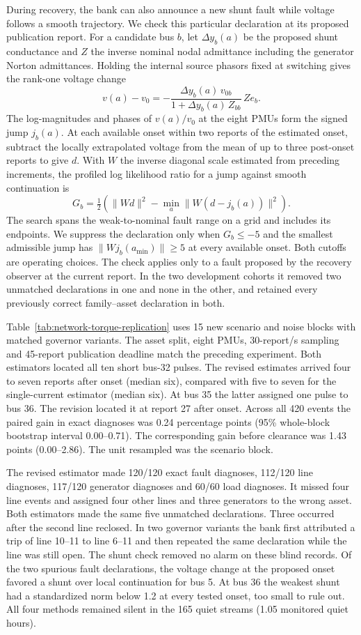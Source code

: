During recovery, the bank can also announce a new shunt fault while
voltage follows a smooth trajectory. We check this particular
declaration at its proposed publication report. For a candidate
bus $b$, let $\Delta y_b(a)$ be the proposed shunt conductance and
$Z$ the inverse nominal nodal admittance including the generator
Norton admittances. Holding the internal source phasors fixed at
switching gives the rank-one voltage change
\[
 v(a)-v_0=-\frac{\Delta y_b(a)\,v_{0b}}
                    {1+\Delta y_b(a)\,Z_{bb}}\, Z e_b .
\]
The log-magnitudes and phases of $v(a)/v_0$ at the eight PMUs
form the signed jump $j_b(a)$.
At each available onset within two reports of the estimated onset,
subtract the locally extrapolated voltage from the mean of up to
three post-onset reports to give $d$. With $W$ the inverse diagonal
scale estimated from preceding increments, the profiled log likelihood
ratio for a jump against smooth continuation is
\[
 G_b=\tfrac12\left(\|Wd\|^2-\min_a\|W(d-j_b(a))\|^2\right).
\]
The search spans the weak-to-nominal fault range on a grid and
includes its endpoints. We suppress the declaration only when
$G_b\leq -5$ and the smallest admissible jump has
$\|Wj_b(a_{\min})\|\geq5$ at every available onset. Both cutoffs
are operating choices. The check applies only to a fault proposed
by the recovery observer at the current report. In the two
development cohorts it removed two unmatched declarations in one
and none in the other, and retained every previously correct
family--asset declaration in both.



Table~\ref{tab:network-torque-replication} uses 15 new scenario and
noise blocks with matched governor variants. The asset split, eight
PMUs, 30-report/s sampling and 45-report publication deadline match
the preceding experiment. Both estimators located all ten short
bus-32 pulses. The revised estimates arrived four to seven reports
after onset (median six), compared with five to seven for the
single-current estimator (median six). At bus 35 the latter assigned
one pulse to bus 36. The revision located it at report 27 after onset.
Across all 420 events the paired gain in exact diagnoses was 0.24
percentage points (95\% whole-block bootstrap interval 0.00--0.71).
The corresponding gain before clearance was 1.43 points
(0.00--2.86). The unit resampled was the scenario block.

The revised estimator made 120/120 exact fault diagnoses, 112/120
line diagnoses, 117/120 generator diagnoses and 60/60 load diagnoses.
It missed four line events and assigned four other lines and three
generators to the wrong asset. Both estimators made the same five
unmatched declarations. Three occurred after the second line
reclosed. In two governor variants the bank first attributed a
trip of line 10--11 to line 6--11 and then repeated the same
declaration while the line was still open. The shunt check removed
no alarm on these blind records. Of the two spurious fault
declarations, the voltage change at the proposed onset favored a
shunt over local continuation for bus 5. At bus 36 the weakest
shunt had a standardized norm below 1.2 at every tested onset,
too small to rule out. All four methods remained silent
in the 165 quiet streams (1.05 monitored quiet hours).
